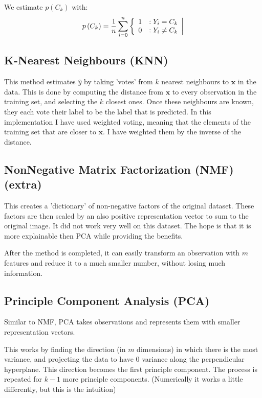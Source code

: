 \documentclass[11pt]{article}
\begin{document}
We estimate \(p\left(C_k\right)\) with:
  \begin{equation}
p\left(C_k\right) = {1\over n}\sum\limits_{i=0}^n \left\{\begin{array}{ll} 1 &: Y_i = C_k\\ 0 &: Y_i \ne C_k\end{array}\right|
  \end{equation}

\subsection{K-Nearest Neighbours (KNN)}
\label{sec:org26f623a}
This method estimates \(\widehat y\) by taking 'votes' from \(k\) nearest neighbours to \(\mathbf x\) in the data. This is done by computing the distance from \(\mathbf x\) to every observation in the training set, and selecting the \(k\) closest ones. Once these neighbours are known, they each vote their label to be the label that is predicted. In this implementation I have used weighted voting, meaning that the elements of the training set that are closer to \(\mathbf{x}\). I have weighted them by the inverse of the distance.
\subsection{NonNegative Matrix Factorization (NMF) (extra)}
\label{sec:org59e4451}
This creates a 'dictionary' of non-negative factors of the original dataset. These factors are then scaled by an also positive representation vector to sum to the original image. It did not work very well on this dataset. The hope is that it is more explainable then PCA while providing the benefits.

After the method is completed, it can easily transform an observation with \(m\) features and reduce it to a much smaller number, without losing much information.

\subsection{Principle Component Analysis (PCA)}
\label{sec:orgf4406f3}
Similar to NMF, PCA takes observations and represents them with smaller representation vectors.

This works by finding the direction (in \(m\) dimensions) in which there is the most variance, and projecting the data to have 0 variance along the perpendicular hyperplane. This direction becomes the first principle component. The process is repeated for \(k-1\) more principle components. (Numerically it works a little differently, but this is the intuition)
\end{document}
